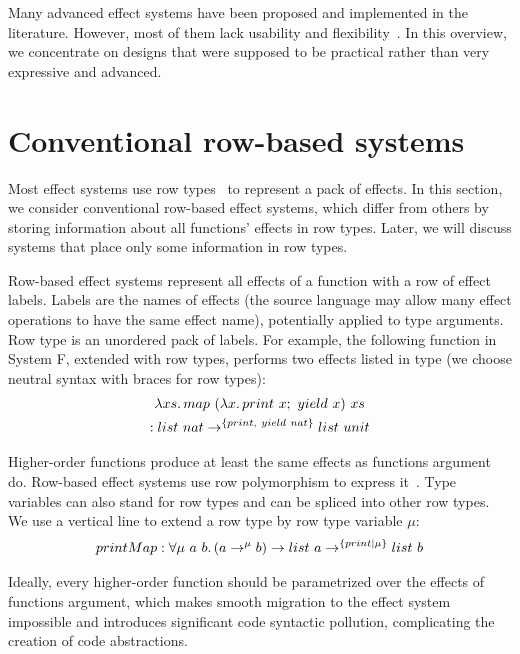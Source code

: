 \documentclass[conference]{IEEEtran}
\newcommand{\seq}{;~}
\newcommand{\ap}{~}
\begin{document}
    Many advanced effect systems have been proposed and implemented in the literature.
    However, most of them lack usability and flexibility~\cite{odersky2022scoped}.
    In this overview, we concentrate on designs that were supposed to be practical rather than very expressive and advanced.


    \section{Conventional row-based systems} \label{sec:rows}

    Most effect systems use row types~\cite{gaster1996polymorphic} to represent a pack of effects.
    In this section, we consider conventional row-based effect systems, which differ from others by storing information about all functions' effects in row types.
    Later, we will discuss systems that place only some information in row types.


    Row-based effect systems represent all effects of a function with a row of effect labels.
    Labels are the names of effects (the source language may allow many effect operations to have the same effect name), potentially applied to type arguments.
    Row type is an unordered pack of labels.
    For example, the following function in System F, extended with row types, performs two effects listed in type (we choose neutral syntax with braces for row types):
    \begin{multline*}
        \lambda xs\ldotp map \ap (\lambda x\ldotp print\ap x\seq yield\ap x) \ap xs \\ : list\ap nat \to^{\{print, ~yield \ap nat\}} list \ap unit
    \end{multline*}

    Higher-order functions produce at least the same effects as functions argument do.
    Row-based effect systems use row polymorphism to express it~\cite{gaster1996polymorphic}.
    Type variables can also stand for row types and can be spliced into other row types.
    We use a vertical line to extend a row type by row type variable $\mu$:
    \begin{multline*}
        printMap : \forall \mu \ap a \ap b\ldotp (a \to^\mu b) \to list \ap a \to^{\{print|\mu\}} list \ap b
    \end{multline*}

    Ideally, every higher-order function should be parametrized over the effects of functions argument, which makes smooth migration to the effect system impossible and introduces significant code syntactic pollution, complicating the creation of code abstractions.
\end{document}
